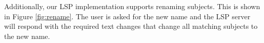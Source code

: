 \documentclass[
]{ceurart}
\begin{document}
Additionally, our LSP implementation supports renaming subjects. This is shown in Figure \ref{fig:rename}. The user is asked for the new name and the LSP server will respond with the required text changes that change all matching subjects to the new name.


%
%
%
%
%
%
\end{document}
